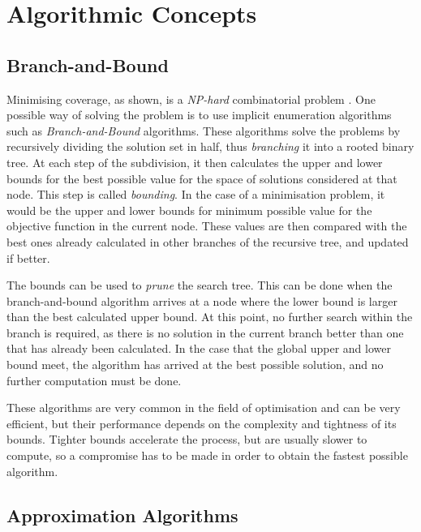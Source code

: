 \section{Algorithmic Concepts}
\subsection{Branch-and-Bound}
Minimising coverage, as shown, is a \emph{NP-hard} combinatorial problem \cite{complex}. One possible way of solving the problem is to use implicit enumeration algorithms such as \emph{Branch-and-Bound} algorithms.
These algorithms solve the problems by recursively dividing the solution set in half, thus \emph{branching} it into a rooted binary tree.
At each step of the subdivision, it then calculates the upper and lower bounds for the best possible value for the space of solutions considered at that node. This step is called \emph{bounding}.
In the case of a minimisation problem, it would be the upper and lower bounds for minimum possible value for the objective function in the current node. These values are then compared with the best ones already calculated in other branches of the recursive tree, and updated if better.

The bounds can be used to \emph{prune} the search tree. This can be done when the branch-and-bound algorithm arrives at a node where the lower bound is larger than the best calculated upper bound. At this point, no further search within the branch is required, as there is no solution in the current branch better than one that has already been calculated. 
In the case that the global upper and lower bound meet, the algorithm has arrived at the best possible solution, and no further computation must be done.

These algorithms are very common in the field of optimisation and can be very efficient, but their performance depends on the complexity and tightness of its bounds. Tighter bounds accelerate the process, but are usually slower to compute, so a compromise has to be made in order to obtain the fastest possible algorithm.

\subsection{Approximation Algorithms}

